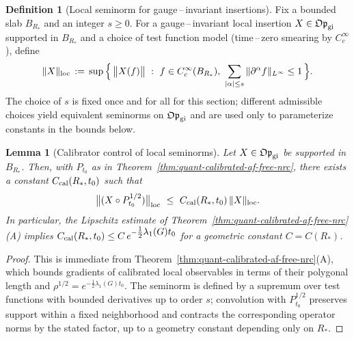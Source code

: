 \documentclass[11pt]{amsart}
\theoremstyle{plain}
\newtheorem{lemma}[theorem]{Lemma}
\theoremstyle{definition}
\newtheorem{definition}[theorem]{Definition}
\theoremstyle{remark}
\renewcommand{\tfrac}[2]{\textstyle\frac{#1}{#2}}
\begin{document}
\begin{definition}[Local seminorm for gauge\,–\,invariant insertions]\label{def:local-seminorm}
Fix a bounded slab $B_{R_*}$ and an integer $s\ge 0$. For a gauge\,–\,invariant local insertion $X\in \mathfrak{Op}_{\rm gi}$ supported in $B_{R_*}$ and a choice of test function model (time\,–\,zero smearing by $C_c^\infty$), define
\[
  \|X\|_{\rm loc}
  \,:=\, \sup\Big\{\, \big\| X(f) \big\|\ :\ f\in C_c^\infty(B_{R_*}),\ \sum_{|\alpha|\le s}\|\partial^\alpha f\|_{L^\infty}\le 1\,\Big\}.
\]
The choice of $s$ is fixed once and for all for this section; different admissible choices yield equivalent seminorms on $\mathfrak{Op}_{\rm gi}$ and are used only to parameterize constants in the bounds below.
\end{definition}

\begin{lemma}[Calibrator control of local seminorms]\label{lem:local-seminorm-cal}
Let $X\in \mathfrak{Op}_{\rm gi}$ be supported in $B_{R_*}$. Then, with $P_{t_0}$ as in Theorem~\ref{thm:quant-calibrated-af-free-nrc}, there exists a constant $C_{\rm cal}(R_*,t_0)$ such that
\[
  \big\| (X\circ P_{t_0}^{1/2}) \big\|_{\rm loc}\ \le\ C_{\rm cal}(R_*,t_0)\, \|X\|_{\rm loc}.
\]
In particular, the Lipschitz estimate of Theorem~\ref{thm:quant-calibrated-af-free-nrc}(A) implies $C_{\rm cal}(R_*,t_0)\le C\,e^{-\tfrac12\lambda_1(G) t_0}$ for a geometric constant $C=C(R_*)$.
\end{lemma}
\begin{proof}
This is immediate from Theorem~\ref{thm:quant-calibrated-af-free-nrc}(A), which bounds gradients of calibrated local observables in terms of their polygonal length and $\rho^{1/2}=e^{-\tfrac12\lambda_1(G) t_0}$. The seminorm is defined by a supremum over test functions with bounded derivatives up to order $s$; convolution with $P_{t_0}^{1/2}$ preserves support within a fixed neighborhood and contracts the corresponding operator norms by the stated factor, up to a geometry constant depending only on $R_*$.
\end{proof}
\end{document}
